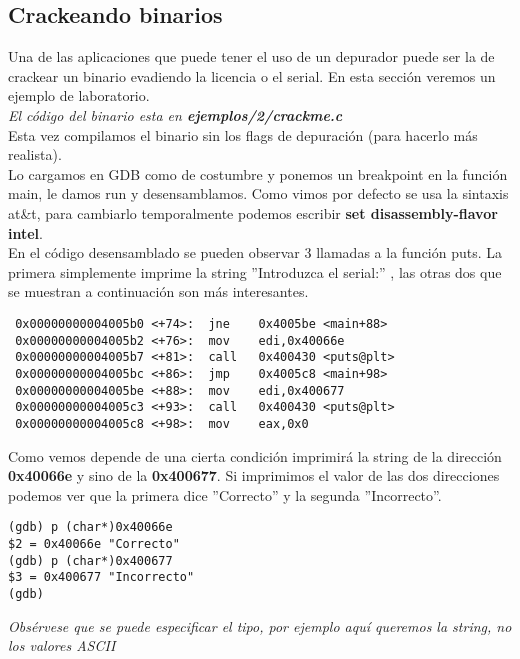 \subsection{Crackeando binarios}
Una de las aplicaciones que puede tener el uso de un depurador puede ser la de crackear un binario evadiendo la licencia o el serial. En esta sección veremos un ejemplo de laboratorio. \\
 
\emph{El código del binario esta en \textbf{ejemplos/2/crackme.c}}\\

Esta vez compilamos el binario sin los flags de depuración (para hacerlo más realista).\\
Lo cargamos en GDB como de costumbre y ponemos un breakpoint en la función main, le damos run y desensamblamos. Como vimos por defecto se usa la sintaxis at\&t, para cambiarlo temporalmente podemos escribir \textbf{set disassembly-flavor intel}. \\
En el código desensamblado se pueden observar 3 llamadas a la función puts. La primera simplemente imprime la string ''Introduzca el serial:'' , las otras dos que se muestran a continuación son más interesantes.
\begin{verbatim}
 0x00000000004005b0 <+74>:	jne    0x4005be <main+88>
 0x00000000004005b2 <+76>:	mov    edi,0x40066e
 0x00000000004005b7 <+81>:	call   0x400430 <puts@plt>
 0x00000000004005bc <+86>:	jmp    0x4005c8 <main+98>
 0x00000000004005be <+88>:	mov    edi,0x400677
 0x00000000004005c3 <+93>:	call   0x400430 <puts@plt>
 0x00000000004005c8 <+98>:	mov    eax,0x0
\end{verbatim}
Como vemos depende de una cierta condición imprimirá la string de la dirección \textbf{0x40066e} y sino de la \textbf{0x400677}. Si imprimimos el valor de las dos direcciones podemos ver que la primera dice ''Correcto'' y la segunda ''Incorrecto''.
\begin{verbatim}
(gdb) p (char*)0x40066e
$2 = 0x40066e "Correcto"
(gdb) p (char*)0x400677
$3 = 0x400677 "Incorrecto"
(gdb)
\end{verbatim}
\emph{Obsérvese que se puede especificar el tipo, por ejemplo aquí queremos la string, no los valores ASCII}\\

